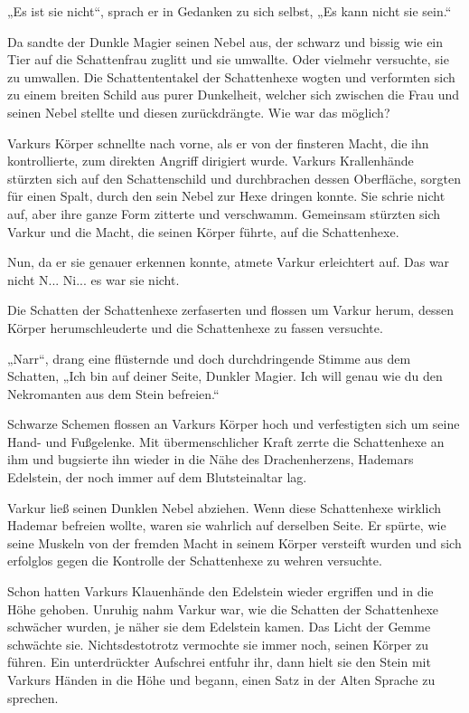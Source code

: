 \documentclass[10pt, a4paper, oneside]{book}
\begin{document}
„Es ist sie nicht“, sprach er in Gedanken zu sich selbst, „Es kann nicht sie sein.“

Da sandte der Dunkle Magier seinen Nebel aus, der schwarz und bissig wie ein Tier auf die Schattenfrau zuglitt und sie umwallte. Oder vielmehr versuchte, sie zu umwallen. Die Schattententakel der Schattenhexe wogten und verformten sich zu einem breiten Schild aus purer Dunkelheit, welcher sich zwischen die Frau und seinen Nebel stellte und diesen zurückdrängte. Wie war das möglich?

Varkurs Körper schnellte nach vorne, als er von der finsteren Macht, die ihn kontrollierte, zum direkten Angriff dirigiert wurde. Varkurs Krallenhände stürzten sich auf den Schattenschild und durchbrachen dessen Oberfläche, sorgten für einen Spalt, durch den sein Nebel zur Hexe dringen konnte. Sie schrie nicht auf, aber ihre ganze Form zitterte und verschwamm. Gemeinsam stürzten sich Varkur und die Macht, die seinen Körper führte, auf die Schattenhexe.

Nun, da er sie genauer erkennen konnte, atmete Varkur erleichtert auf. Das war nicht N... Ni... es war sie nicht.

Die Schatten der Schattenhexe zerfaserten und flossen um Varkur herum, dessen Körper herumschleuderte und die Schattenhexe zu fassen versuchte.

„Narr“, drang eine flüsternde und doch durchdringende Stimme aus dem Schatten, „Ich bin auf deiner Seite, Dunkler Magier. Ich will genau wie du den Nekromanten aus dem Stein befreien.“

Schwarze Schemen flossen an Varkurs Körper hoch und verfestigten sich um seine Hand- und Fußgelenke. Mit übermenschlicher Kraft zerrte die Schattenhexe an ihm und bugsierte ihn wieder in die Nähe des Drachenherzens, Hademars Edelstein, der noch immer auf dem Blutsteinaltar lag.

Varkur ließ seinen Dunklen Nebel abziehen. Wenn diese Schattenhexe wirklich Hademar befreien wollte, waren sie wahrlich auf derselben Seite. Er spürte, wie seine Muskeln von der fremden Macht in seinem Körper versteift wurden und sich erfolglos gegen die Kontrolle der Schattenhexe zu wehren versuchte.

Schon hatten Varkurs Klauenhände den Edelstein wieder ergriffen und in die Höhe gehoben. Unruhig nahm Varkur war, wie die Schatten der Schattenhexe schwächer wurden, je näher sie dem Edelstein kamen. Das Licht der Gemme schwächte sie. Nichtsdestotrotz vermochte sie immer noch, seinen Körper zu führen. Ein unterdrückter Aufschrei entfuhr ihr, dann hielt sie den Stein mit Varkurs Händen in die Höhe und begann, einen Satz in der Alten Sprache zu sprechen.
\end{document}
